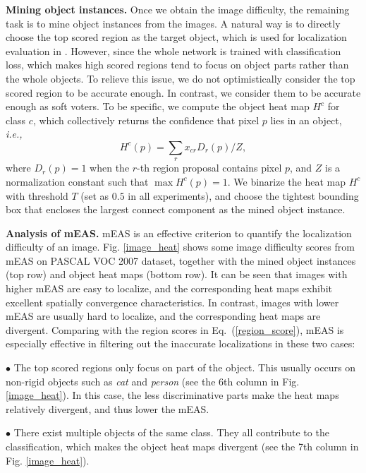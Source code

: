 \documentclass[10pt,twocolumn,letterpaper]{article}
\begin{document}
\textbf{Mining object instances.} Once we obtain the image difficulty, the remaining task is to mine object instances from the images. A natural way is to directly choose the top scored region as the target object, which is used for localization evaluation in \cite{bency2016weakly}. However, since the whole network is trained with classification loss, which makes high scored regions tend to focus on object parts rather than the whole objects. To relieve this issue, we do not optimistically consider the top scored region to be accurate enough. In contrast, we consider them to be accurate enough as soft voters. To be specific, we compute the object heat map $H^c$ for class $c$, which collectively returns the confidence that pixel $p$ lies in an object, \emph{i.e.,}
\begin{equation}\label{heatmap}
  H^c(p)=\sum_rx_{cr}D_r(p)/Z,
\end{equation}
where $D_r(p)\!=\!1$ when the $r$-th region proposal contains pixel $p$, and $Z$ is a normalization constant such that $\max H^c(p)\!=\!1$. We binarize the heat map $H^c$ with threshold $T$ (set as $0.5$ in all experiments), and choose the tightest bounding box that encloses the largest connect component as the mined object instance.

\textbf{Analysis of mEAS.} mEAS is an effective criterion to quantify the localization difficulty of an image. Fig. \ref{image_heat} shows some image difficulty scores from mEAS on PASCAL VOC 2007 dataset, together with the mined object instances (top row) and object heat maps (bottom row). It can be seen that images with higher mEAS are easy to localize, and the corresponding heat maps exhibit excellent spatially convergence characteristics. In contrast, images with lower mEAS are usually hard to localize, and the corresponding heat maps are divergent. Comparing with the region scores in Eq.~(\ref{region_score}), mEAS is especially effective in filtering out the inaccurate localizations in these two cases:

$\bullet$ The top scored regions only focus on part of the object. This usually occurs on non-rigid objects such as \textit{cat} and \textit{person} (see the 6th column in Fig. \ref{image_heat}). In this case, the less discriminative parts make the heat maps relatively divergent, and thus lower the mEAS.

$\bullet$ There exist multiple objects of the same class. They all contribute to the classification, which makes the object heat maps divergent (see the 7th column in Fig. \ref{image_heat}).
\end{document}
